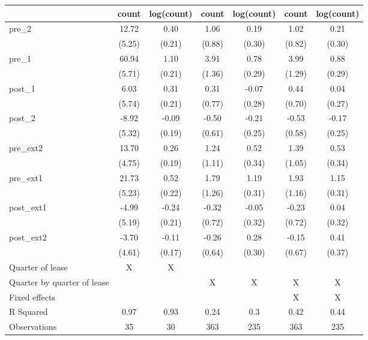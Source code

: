 \begin{tabular}{l*{6}{c}} \hline\hline
                &\multicolumn{1}{c}{count }&\multicolumn{1}{c}{log(count)}&\multicolumn{1}{c}{ count }&\multicolumn{1}{c}{log(count)}&\multicolumn{1}{c}{ count }&\multicolumn{1}{c}{log(count)}\\
\hline
pre\_2           &    12.72&     0.40&     1.06&     0.19&     1.02&     0.21\\
                &   (5.25)&   (0.21)&   (0.88)&   (0.30)&   (0.82)&   (0.30)\\
pre\_1           &    60.94&     1.10&     3.91&     0.78&     3.99&     0.88\\
                &   (5.71)&   (0.21)&   (1.36)&   (0.29)&   (1.29)&   (0.29)\\
post\_1          &     6.03&     0.31&     0.31&    -0.07&     0.44&     0.04\\
                &   (5.74)&   (0.21)&   (0.77)&   (0.28)&   (0.70)&   (0.27)\\
post\_2          &    -8.92&    -0.09&    -0.50&    -0.21&    -0.53&    -0.17\\
                &   (5.32)&   (0.19)&   (0.61)&   (0.25)&   (0.58)&   (0.25)\\
pre\_ext2        &    13.70&     0.26&     1.24&     0.52&     1.39&     0.53\\
                &   (4.75)&   (0.19)&   (1.11)&   (0.34)&   (1.05)&   (0.34)\\
pre\_ext1        &    21.73&     0.52&     1.79&     1.19&     1.93&     1.15\\
                &   (5.23)&   (0.22)&   (1.26)&   (0.31)&   (1.16)&   (0.31)\\
post\_ext1       &    -4.99&    -0.24&    -0.32&    -0.05&    -0.23&     0.04\\
                &   (5.19)&   (0.21)&   (0.72)&   (0.32)&   (0.72)&   (0.32)\\
post\_ext2       &    -3.70&    -0.11&    -0.26&     0.28&    -0.15&     0.41\\
                &   (4.61)&   (0.17)&   (0.64)&   (0.30)&   (0.67)&   (0.37)\\
\hline
Quarter of lease &        X&        X&         &         &         &         \\
Quarter by quarter of lease &         &         &        X&        X&        X&        X\\
Fixed effects   &         &         &         &         &        X&        X\\
R Squared       &     0.97&     0.93&     0.24&      0.3&     0.42&     0.44\\
Observations    &       35&       30&      363&      235&      363&      235\\
\hline\hline
\end{tabular}

